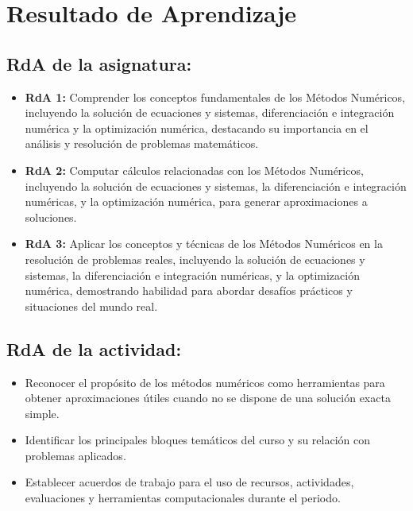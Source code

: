 \documentclass[a4,11pt]{aleph-notas}
\begin{document}
\encabezado

\section*{Resultado de Aprendizaje}

\subsection*{RdA de la asignatura:}
\begin{itemize}[leftmargin=*]
    \item \textbf{RdA 1:} Comprender los conceptos fundamentales de los Métodos Numéricos, incluyendo la solución de ecuaciones y sistemas, diferenciación e integración numérica y la optimización numérica, destacando su importancia en el análisis y resolución de problemas matemáticos.
    \item \textbf{RdA 2:} Computar cálculos relacionadas con los Métodos Numéricos, incluyendo la solución de ecuaciones y sistemas, la diferenciación e integración numéricas, y la optimización numérica, para generar aproximaciones a soluciones.
    \item \textbf{RdA 3:} Aplicar los conceptos y técnicas de los Métodos Numéricos en la resolución de problemas reales, incluyendo la solución de ecuaciones y sistemas, la diferenciación e integración numéricas, y la optimización numérica, demostrando habilidad para abordar desafíos prácticos y situaciones del mundo real.
\end{itemize}

\subsection*{RdA de la actividad:}
\begin{itemize}[leftmargin=*]
    \item Reconocer el propósito de los métodos numéricos como herramientas para obtener aproximaciones útiles cuando no se dispone de una solución exacta simple.
    \item Identificar los principales bloques temáticos del curso y su relación con problemas aplicados.
    \item Establecer acuerdos de trabajo para el uso de recursos, actividades, evaluaciones y herramientas computacionales durante el periodo.
\end{itemize}
\end{document}
